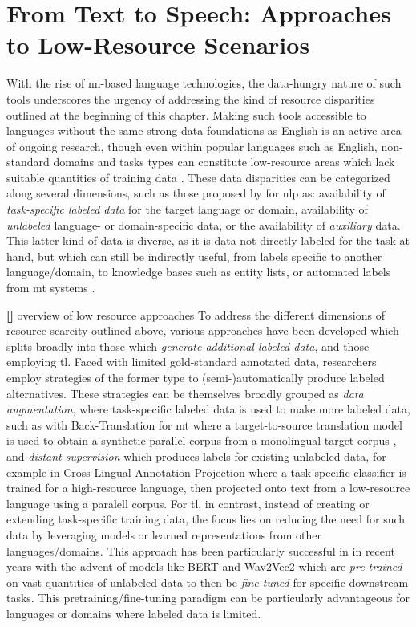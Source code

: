 \documentclass[thesis]{cluu}
\newcounter{paranum}
\newcommand{\numberedparagraph}{\par\refstepcounter{paranum}\textbf{[\theparanum] }}
\begin{document}
\section{From Text to Speech: Approaches to Low-Resource Scenarios}
With the rise of \gls{nn}-based language technologies, the data-hungry nature of such tools underscores the urgency of addressing the kind of resource disparities outlined at the beginning of this chapter. Making such tools accessible to languages without the same strong data foundations as English is an active area of ongoing research, though even within popular languages such as English, non-standard domains and tasks types can constitute low-resource areas which lack suitable quantities of training data \parencite{hedderichSurveyRecentApproaches2021}. These data disparities can be categorized along several dimensions, such as those proposed by \textcite{hedderichSurveyRecentApproaches2021} for \gls{nlp} as: availability of \textit{task-specific labeled data} for the target language or domain, availability of \textit{unlabeled} language- or domain-specific data, or the availability of \textit{auxiliary} data. This latter kind of data is diverse, as it is data not directly labeled for the task at hand, but which can still be indirectly useful, from labels specific to another language/domain, to knowledge bases such as entity lists, or automated labels from \gls{mt} systems \parencite{hedderichSurveyRecentApproaches2021}.

\numberedparagraph{overview of low resource approaches}
To address the different dimensions of resource scarcity outlined above, various approaches have been developed which \textcite{hedderichSurveyRecentApproaches2021} splits broadly into those which \textit{generate additional labeled data}, and those employing \gls{tl}. Faced with limited gold-standard annotated data, researchers employ strategies of the former type to (semi-)automatically produce labeled alternatives. These strategies can be themselves broadly grouped as \textit{data augmentation}, where task-specific labeled data is used to make more labeled data, such as with Back-Translation for \gls{mt} where a target-to-source translation model is used to obtain a synthetic parallel corpus from a monolingual target corpus \parencite{ranathungaNeuralMachineTranslation2021}, and \textit{distant supervision} which produces labels for existing unlabeled data, for example in Cross-Lingual Annotation Projection where a task-specific classifier is trained for a high-resource language, then projected onto text from a low-resource language using a paralell corpus. For \gls{tl}, in contrast, instead of creating or extending task-specific training data, the focus lies on reducing the need for such data by leveraging models or learned representations from other languages/domains. This approach has been particularly successful in in recent years with the advent of models like BERT \parencite{devlinBERTPretrainingDeep2019} and Wav2Vec2 \parencite{baevskiWav2vec20Framework2020} which are \textit{pre-trained} on vast quantities of unlabeled data to then be \textit{fine-tuned} for specific downstream tasks. This pretraining/fine-tuning paradigm can be particularly advantageous for languages or domains where labeled data is limited.
\end{document}
